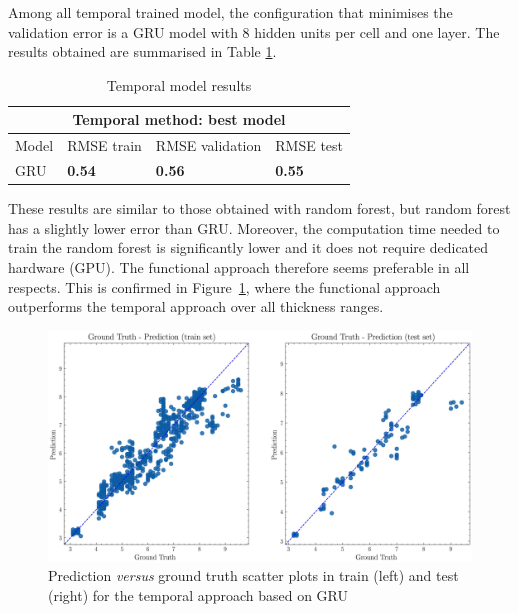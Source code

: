 Among all temporal trained model, the configuration that minimises the validation error is a GRU model with 8 hidden units per cell and one layer. The results obtained are summarised in Table \ref{tab:temporal_model_results}.
%
\begin{table}
    \centering
    \begin{tabular}{|p{3.2cm}|p{3.2cm}|p{3.2cm}|p{3.2cm}|}
    \hline
    \multicolumn{4}{|c|}{Temporal method: best model} \\
    \hline
    Model & RMSE train  & RMSE validation  & RMSE test  \\
    \hline
    GRU & \textbf{0.54} & \textbf{0.56} & \textbf{0.55} \\
    \hline
    \end{tabular}
    \caption{Temporal model results}
    \label{tab:temporal_model_results}
\end{table}
%
These results are similar to those obtained with random forest, but random forest has a slightly lower error than GRU. Moreover, the computation time needed to train the random forest is significantly lower and it does not require dedicated hardware (GPU). The functional approach therefore seems preferable in all respects. This is confirmed in Figure~\ref{fig:gt_prediction_temporal}, where the functional approach outperforms the temporal approach over all thickness ranges.
\begin{figure}
\centering
\includegraphics[scale=0.48]{images/chapter_4/gt_temporal.eps}
\caption{Prediction \textit{versus} ground truth scatter plots in train (left) and test (right) for the temporal approach based on GRU}
\label{fig:gt_prediction_temporal}
\end{figure}

